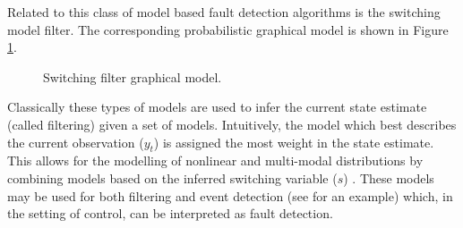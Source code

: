 Related to this class of model based fault detection algorithms is the switching model filter. The corresponding probabilistic graphical model is shown in Figure \ref{fig_spf_skf}.
\begin{figure}[ht] 
\centering
{}
\caption{Switching filter graphical model.}
\label{fig_spf_skf}
\end{figure}
Classically these types of models are used to infer the current state  estimate (called filtering) given a set of models. Intuitively, the model which best describes the current observation ($y_t$) is assigned the most weight in the state estimate. This allows for the modelling of nonlinear and multi-modal distributions by combining models based on the inferred switching variable ($s$) \cite{murphy1}. These models may be used for both filtering and event detection (see \cite{veerar} for an example) which, in the setting of control, can be interpreted as fault detection.

